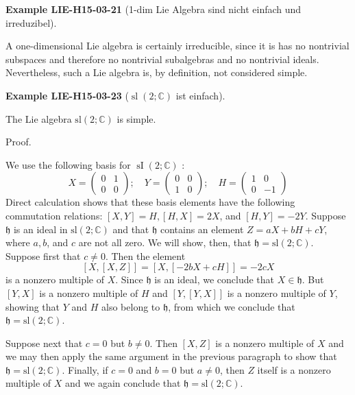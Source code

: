 \documentclass[10pt, letterpaper]{article}
\newcommand{\C}{\mathbb{C}}
\newcommand{\CustomHeading}[3]{%
  \par\medskip\noindent%
  \textbf{#1 #2} \textnormal{(#3)}.\enskip%
}
\newenvironment{EXA}[2]{\CustomHeading{Example}{#1}{#2}}{}
\begin{document}
\begin{EXA}{LIE-H15-03-21}{1-dim Lie Algebra sind nicht einfach und irreduzibel}
A one-dimensional Lie algebra is certainly irreducible, since it is has no nontrivial subspaces and therefore no nontrivial subalgebras and no nontrivial ideals. Nevertheless, such a Lie algebra is, by definition, not considered simple.
\end{EXA}

\begin{EXA}{LIE-H15-03-23}{$\operatorname{sl}(2;\C)$ ist einfach}
The Lie algebra $\mathrm{sl}(2 ; \mathbb{C})$ is simple.

Proof. 

We use the following basis for $\operatorname{sI}(2 ; \mathbb{C})$ :
$$
X=\left(\begin{array}{ll}
0 & 1 \\
0 & 0
\end{array}\right) ; \quad Y=\left(\begin{array}{ll}
0 & 0 \\
1 & 0
\end{array}\right) ; \quad H=\left(\begin{array}{rr}
1 & 0 \\
0 & -1
\end{array}\right)
$$
Direct calculation shows that these basis elements have the following commutation relations: $[X, Y]=H,[H, X]=2 X$, and $[H, Y]=-2 Y$. Suppose $\mathfrak{h}$ is an ideal in $\mathrm{sl}(2 ; \mathbb{C})$ and that $\mathfrak{h}$ contains an element $Z=a X+b H+c Y$, where $a, b$, and $c$ are not all zero. We will show, then, that $\mathfrak{h}=\mathrm{sl}(2 ; \mathbb{C})$. Suppose first that $c \neq 0$. Then the element
$$
[X,[X, Z]]=[X,[-2 b X+c H]]=-2 c X
$$
is a nonzero multiple of $X$. Since $\mathfrak{h}$ is an ideal, we conclude that $X \in \mathfrak{h}$. But $[Y, X]$ is a nonzero multiple of $H$ and $[Y,[Y, X]]$ is a nonzero multiple of $Y$, showing that $Y$ and $H$ also belong to $\mathfrak{h}$, from which we conclude that $\mathfrak{h}=\mathrm{sl}(2 ; \mathbb{C})$.

Suppose next that $c=0$ but $b \neq 0$. Then $[X, Z]$ is a nonzero multiple of $X$ and we may then apply the same argument in the previous paragraph to show that $\mathfrak{h}=\mathrm{sl}(2 ; \mathbb{C})$. Finally, if $c=0$ and $b=0$ but $a \neq 0$, then $Z$ itself is a nonzero multiple of $X$ and we again conclude that $\mathfrak{h}=\mathrm{sl}(2 ; \mathbb{C})$.
\end{EXA}
\end{document}
